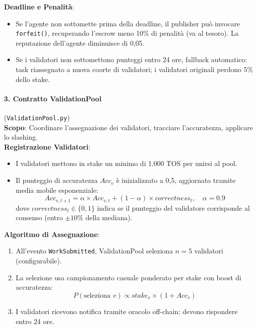 \documentclass[11pt]{article}
\begin{document}
\textbf{Deadline e Penalità}:
\begin{itemize}[noitemsep]
  \item Se l'agente non sottomette prima della deadline, il publisher può invocare \texttt{forfeit()}, recuperando l'escrow meno 10\% di penalità (va al tesoro). La reputazione dell'agente diminuisce di 0,05.
  \item Se i validatori non sottomettono punteggi entro 24 ore, fallback automatico: task riassegnato a nuova coorte di validatori; i validatori originali perdono 5\% dello stake.
\end{itemize}

\paragraph{3. Contratto ValidationPool} (\texttt{ValidationPool.py})\\
\textbf{Scopo}: Coordinare l'assegnazione dei validatori, tracciare l'accuratezza, applicare lo slashing.\\
\textbf{Registrazione Validatori}:
\begin{itemize}[noitemsep]
  \item I validatori mettono in stake un minimo di 1.000 TOS per unirsi al pool.
  \item Il punteggio di accuratezza $Acc_v$ è inizializzato a 0,5, aggiornato tramite media mobile esponenziale:
    \begin{equation}
    Acc_{v,t+1} = \alpha \times Acc_{v,t} + (1-\alpha) \times correctness_t, \quad \alpha = 0.9
    \end{equation}
    dove $correctness_t \in \{0,1\}$ indica se il punteggio del validatore corrisponde al consenso (entro $\pm10\%$ della mediana).
\end{itemize}
\textbf{Algoritmo di Assegnazione}:
\begin{enumerate}[noitemsep]
  \item All'evento \texttt{WorkSubmitted}, ValidationPool seleziona $n=5$ validatori (configurabile).
  \item La selezione usa campionamento casuale ponderato per stake con boost di accuratezza:
    \begin{equation}
    P(\text{seleziona } v) \propto stake_v \times (1 + Acc_v)
    \end{equation}
  \item I validatori ricevono notifica tramite oracolo off-chain; devono rispondere entro 24 ore.
\end{enumerate}
\end{document}
